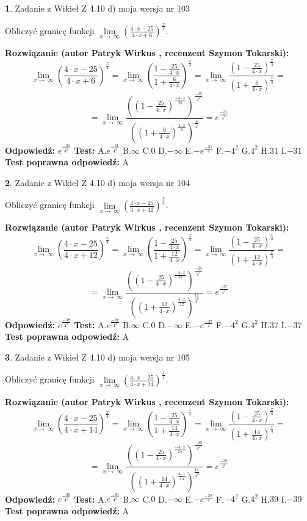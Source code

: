 \documentclass[12pt, a4paper]{article}
\theoremstyle{definition} %
\newtheorem{zad}{}
\newcommand{\zadStart}[1]{\begin{zad}#1\newline}
\newcommand{\zadStop}{\end{zad}}
\newcommand{\rozwStart}[2]{\noindent \textbf{Rozwiązanie (autor #1 , recenzent #2): }\newline}
\newcommand{\rozwStop}{\newline}
\newcommand{\odpStart}{\noindent \textbf{Odpowiedź:}\newline}
\newcommand{\odpStop}{\newline}
\newcommand{\testStart}{\noindent \textbf{Test:}\newline}
\newcommand{\testStop}{\newline}
\newcommand{\kluczStart}{\noindent \textbf{Test poprawna odpowiedź:}\newline}
\newcommand{\kluczStop}{\newline}
\begin{document}
\zadStart{Zadanie z Wikieł Z 4.10 d) moja wersja nr 103}


Obliczyć granicę funkcji  $\lim\limits_{x\to\ \infty}(\frac{4\cdot x-25}{4\cdot x+6})^{\frac{x}{4}}$.
\zadStop
\rozwStart{Patryk Wirkus}{Szymon Tokarski}
$$\lim\limits_{x\to\ \infty}(\frac{4\cdot x-25}{4\cdot x+6})^{\frac{x}{4}} = \lim\limits_{x\to\ \infty}(\frac{1-\frac{25}{4\cdot x}}{1+\frac{6}{4\cdot x}})^{\frac{x}{4}}=\lim\limits_{x\to\ \infty}\frac{(1-\frac{25}{4\cdot x})^{\frac{x}{4}}}{(1+\frac{6}{4\cdot x})^{\frac{x}{4}}}=$$
$$=\lim\limits_{x\to\ \infty}\frac{((1-\frac{25}{4\cdot x})^{\frac{-4\cdot x}{25}})^{\frac{-25}{4^{2}}}}{((1+\frac{6}{4\cdot x})^{\frac{4\cdot x}{6}})^{\frac{6}{4^{2}}}}=e^{\frac{-31}{4^{2}}}$$
\rozwStop
\odpStart
$e^{\frac{-31}{4^{2}}}$
\odpStop
\testStart
A.$e^{\frac{-31}{4^{2}}}$ B.$\infty$ C.$0$ D.$-\infty$ E.$-e^{\frac{-31}{4}}$
F.$-4^{2}$ G.$4^{2}$
H.$31$
I.$-31$
\testStop
\kluczStart
A
\kluczStop



\zadStart{Zadanie z Wikieł Z 4.10 d) moja wersja nr 104}


Obliczyć granicę funkcji  $\lim\limits_{x\to\ \infty}(\frac{4\cdot x-25}{4\cdot x+12})^{\frac{x}{4}}$.
\zadStop
\rozwStart{Patryk Wirkus}{Szymon Tokarski}
$$\lim\limits_{x\to\ \infty}(\frac{4\cdot x-25}{4\cdot x+12})^{\frac{x}{4}} = \lim\limits_{x\to\ \infty}(\frac{1-\frac{25}{4\cdot x}}{1+\frac{12}{4\cdot x}})^{\frac{x}{4}}=\lim\limits_{x\to\ \infty}\frac{(1-\frac{25}{4\cdot x})^{\frac{x}{4}}}{(1+\frac{12}{4\cdot x})^{\frac{x}{4}}}=$$
$$=\lim\limits_{x\to\ \infty}\frac{((1-\frac{25}{4\cdot x})^{\frac{-4\cdot x}{25}})^{\frac{-25}{4^{2}}}}{((1+\frac{12}{4\cdot x})^{\frac{4\cdot x}{12}})^{\frac{12}{4^{2}}}}=e^{\frac{-37}{4^{2}}}$$
\rozwStop
\odpStart
$e^{\frac{-37}{4^{2}}}$
\odpStop
\testStart
A.$e^{\frac{-37}{4^{2}}}$ B.$\infty$ C.$0$ D.$-\infty$ E.$-e^{\frac{-37}{4}}$
F.$-4^{2}$ G.$4^{2}$
H.$37$
I.$-37$
\testStop
\kluczStart
A
\kluczStop



\zadStart{Zadanie z Wikieł Z 4.10 d) moja wersja nr 105}


Obliczyć granicę funkcji  $\lim\limits_{x\to\ \infty}(\frac{4\cdot x-25}{4\cdot x+14})^{\frac{x}{4}}$.
\zadStop
\rozwStart{Patryk Wirkus}{Szymon Tokarski}
$$\lim\limits_{x\to\ \infty}(\frac{4\cdot x-25}{4\cdot x+14})^{\frac{x}{4}} = \lim\limits_{x\to\ \infty}(\frac{1-\frac{25}{4\cdot x}}{1+\frac{14}{4\cdot x}})^{\frac{x}{4}}=\lim\limits_{x\to\ \infty}\frac{(1-\frac{25}{4\cdot x})^{\frac{x}{4}}}{(1+\frac{14}{4\cdot x})^{\frac{x}{4}}}=$$
$$=\lim\limits_{x\to\ \infty}\frac{((1-\frac{25}{4\cdot x})^{\frac{-4\cdot x}{25}})^{\frac{-25}{4^{2}}}}{((1+\frac{14}{4\cdot x})^{\frac{4\cdot x}{14}})^{\frac{14}{4^{2}}}}=e^{\frac{-39}{4^{2}}}$$
\rozwStop
\odpStart
$e^{\frac{-39}{4^{2}}}$
\odpStop
\testStart
A.$e^{\frac{-39}{4^{2}}}$ B.$\infty$ C.$0$ D.$-\infty$ E.$-e^{\frac{-39}{4}}$
F.$-4^{2}$ G.$4^{2}$
H.$39$
I.$-39$
\testStop
\kluczStart
A
\kluczStop
\end{document}
